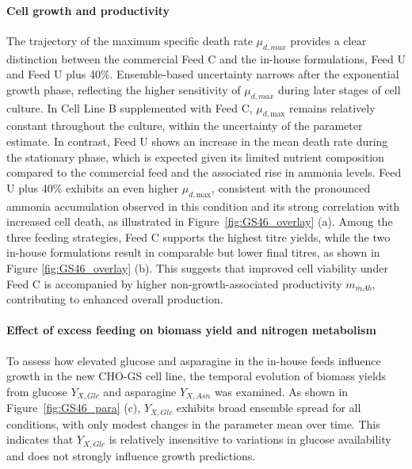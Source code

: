 \paragraph{Cell growth and productivity} The trajectory of the maximum specific death rate $\mu_{d,max}$ provides a clear distinction between the commercial Feed C and the in-house formulations, Feed U and Feed U plus 40\%. Ensemble-based uncertainty narrows after the exponential growth phase, reflecting the higher sensitivity of $\mu_{d,max}$ during later stages of cell culture. In Cell Line B supplemented with Feed C, $\mu_{d,\text{max}}$ remains relatively constant throughout the culture, within the uncertainty of the parameter estimate. In contrast, Feed U shows an increase in the mean death rate during the stationary phase, which is expected given its limited nutrient composition compared to the commercial feed and the associated rise in ammonia levels. Feed U plus 40\% exhibits an even higher $\mu_{d,\text{max}}$, consistent with the pronounced ammonia accumulation observed in this condition and its strong correlation with increased cell death, as illustrated in Figure~\ref{fig:GS46_overlay} (a). Among the three feeding strategies, Feed C supports the highest titre yields, while the two in-house formulations result in comparable but lower final titres, as shown in Figure \ref{fig:GS46_overlay} (b). This suggests that improved cell viability under Feed C is accompanied by higher non-growth-associated productivity $m_{mAb}$, contributing to enhanced overall production.

\paragraph{Effect of excess feeding on biomass yield and nitrogen metabolism}

To assess how elevated glucose and asparagine in the in-house feeds influence growth in the new CHO-GS cell line, the temporal evolution of biomass yields from glucose $Y_{X,Glc}$ and asparagine $Y_{X,Asn}$ was examined. As shown in Figure~\ref{fig:GS46_para} (c), $Y_{X,Glc}$ exhibits broad ensemble spread for all conditions, with only modest changes in the parameter mean over time. This indicates that $Y_{X,Glc}$ is relatively insensitive to variations in glucose availability and does not strongly influence growth predictions.

